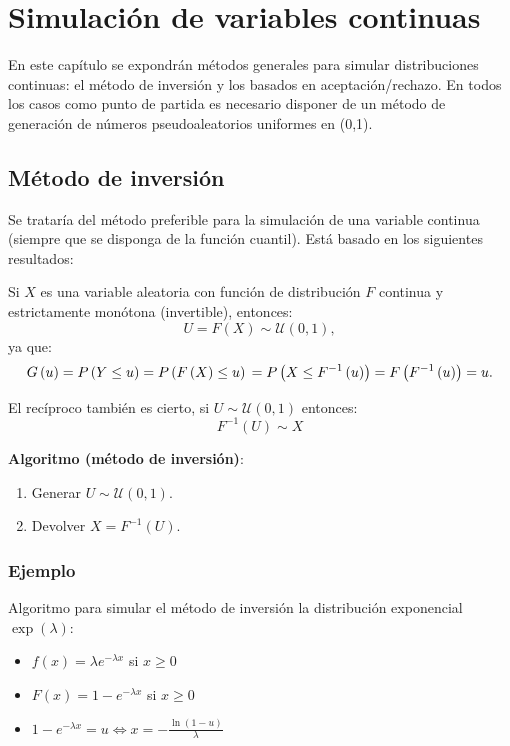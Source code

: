 \documentclass[]{book}
\theoremstyle{definition}
\theoremstyle{definition}
\theoremstyle{definition}
\theoremstyle{remark}
\begin{document}
\chapter{Simulación de variables
continuas}\label{simulacion-de-variables-continuas}

En este capítulo se expondrán métodos generales para simular
distribuciones continuas: el método de inversión y los basados en
aceptación/rechazo. En todos los casos como punto de partida es
necesario disponer de un método de generación de números
pseudoaleatorios uniformes en (0,1).

\section{Método de inversión}\label{metodo-de-inversion}

Se trataría del método preferible para la simulación de una variable
continua (siempre que se disponga de la función cuantil). Está basado en
los siguientes resultados:

Si \(X\) es una variable aleatoria con función de distribución \(F\)
continua y estrictamente monótona (invertible), entonces:
\[U=F\left( X\right) \sim \mathcal{U}\left( 0,1\right),\] ya que:
\[G\left( u\right) = P\left( Y\leq u\right) 
= P\left( F\left( X\right) \leq u\right) \\
= P\left( X\leq F^{-1}\left( u\right) \right) 
= F\left( F^{-1}\left( u\right) \right) = u.\]

El recíproco también es cierto, si
\(U\sim \mathcal{U}\left( 0,1\right)\) entonces:
\[F^{-1}\left( U\right) \sim X\]

\textbf{Algoritmo (método de inversión)}:

\begin{enumerate}
\def\labelenumi{\arabic{enumi}.}
\item
  Generar \(U\sim \mathcal{U}\left( 0,1\right)\).
\item
  Devolver \(X=F^{-1}\left( U\right)\).
\end{enumerate}

\subsection{Ejemplo}\label{ejemplo}

Algoritmo para simular el método de inversión la distribución
exponencial \(\exp \left( \lambda \right)\):

\begin{itemize}
\item
  \(f\left( x\right) =\lambda e^{-\lambda x}\) si \(x\geq 0\)
\item
  \(F\left( x\right) =1-e^{-\lambda x}\) si \(x\geq 0\)
\item
  \(1-e^{-\lambda x}=u \Leftrightarrow  x=-\frac{\ln \left( 1-u\right) }{ \lambda }\)
\end{itemize}
\end{document}
